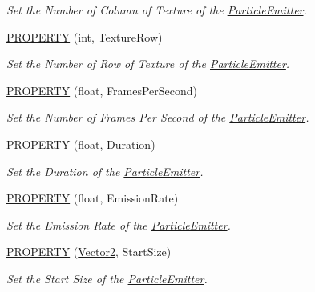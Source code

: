 \begin{DoxyCompactItemize}
\begin{DoxyCompactList}\small\item\em Set the Number of Column of Texture of the \hyperlink{class_magnum_1_1_particle_emitter}{Particle\+Emitter}. \end{DoxyCompactList}\item 
\hyperlink{class_magnum_1_1_particle_emitter_a15ebd3e2018cbca9583c937d0847e3d3}{P\+R\+O\+P\+E\+R\+TY} (int, Texture\+Row)
\begin{DoxyCompactList}\small\item\em Set the Number of Row of Texture of the \hyperlink{class_magnum_1_1_particle_emitter}{Particle\+Emitter}. \end{DoxyCompactList}\item 
\hyperlink{class_magnum_1_1_particle_emitter_a7df1681f2ab51a730b2c066326502fe7}{P\+R\+O\+P\+E\+R\+TY} (float, Frames\+Per\+Second)
\begin{DoxyCompactList}\small\item\em Set the Number of Frames Per Second of the \hyperlink{class_magnum_1_1_particle_emitter}{Particle\+Emitter}. \end{DoxyCompactList}\item 
\hyperlink{class_magnum_1_1_particle_emitter_a48f20b43133950d18bcf3577f89b1600}{P\+R\+O\+P\+E\+R\+TY} (float, Duration)
\begin{DoxyCompactList}\small\item\em Set the Duration of the \hyperlink{class_magnum_1_1_particle_emitter}{Particle\+Emitter}. \end{DoxyCompactList}\item 
\hyperlink{class_magnum_1_1_particle_emitter_afa659cd3aa42c912e959fa58303d9823}{P\+R\+O\+P\+E\+R\+TY} (float, Emission\+Rate)
\begin{DoxyCompactList}\small\item\em Set the Emission Rate of the \hyperlink{class_magnum_1_1_particle_emitter}{Particle\+Emitter}. \end{DoxyCompactList}\item 
\hyperlink{class_magnum_1_1_particle_emitter_ae0aef964fad1e4ec67b8d7a3a19e7317}{P\+R\+O\+P\+E\+R\+TY} (\hyperlink{class_magnum_1_1_vector2}{Vector2}, Start\+Size)
\begin{DoxyCompactList}\small\item\em Set the Start Size of the \hyperlink{class_magnum_1_1_particle_emitter}{Particle\+Emitter}. \end{DoxyCompactList}\item 

\end{DoxyCompactItemize}

